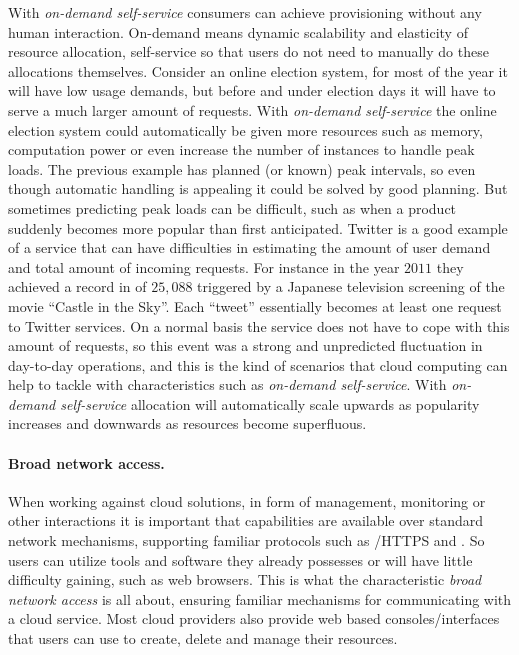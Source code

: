 With \emph{on-demand self-service} consumers can achieve provisioning without any human interaction.
On-demand means dynamic scalability and elasticity of resource allocation,
self-service so that users do not need to manually do these allocations themselves.
Consider an online election system, for most of the year it will have 
low usage demands, but before and under election days it will have to serve
a much larger amount of requests. With \emph{on-demand self-service} the online election system
could automatically be given more resources such as memory, computation power or even
increase the number of instances to handle peak loads.
The previous example has planned (or known) peak intervals, so even though automatic handling
is appealing it could be solved by good planning. 
But sometimes predicting peak loads can be difficult, such as when a product suddenly
becomes more popular than first anticipated.
Twitter is a good example of a service that can have difficulties in estimating 
the amount of user demand and total amount of incoming requests.
For instance in the year $2011$ they achieved a record in  of
$25,088$ triggered by a Japanese television screening of the movie ``Castle in the Sky''.
Each ``tweet'' essentially becomes at least one request to Twitter services.
On a normal basis the service does not have to cope with this amount of requests, so
this event was a strong and unpredicted fluctuation in day-to-day operations,
and this is the kind of scenarios that cloud computing can help to tackle with
characteristics such as \emph{on-demand self-service}.
With \emph{on-demand self-service} allocation will automatically scale upwards as popularity increases 
and downwards as resources become superfluous.

\paragraph{Broad network access.}

When working against cloud solutions, in form of management, monitoring or other 
interactions it is important that capabilities are available over standard network mechanisms,
supporting familiar protocols such as /HTTPS and .
So users can utilize tools and software they already possesses
or will have little difficulty gaining, such as web browsers.
This is what the characteristic \emph{broad network access} is all about,
ensuring familiar mechanisms for communicating with a cloud service.
Most cloud providers also provide web based consoles/interfaces that users can use
to create, delete and manage their resources.

